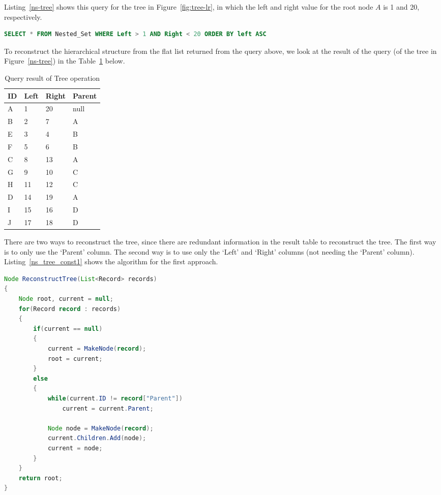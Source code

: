 Listing~\ref{ns-tree} shows this query for the tree in Figure~\ref{fig:tree-lr}, in which the left and right value for the root node $A$ is 1 and 20, respectively.

\begin{lstlisting}[language=sql, caption={Query for Tree for tree $A$ via nested set model},label=ns-tree]
SELECT * FROM Nested_Set WHERE Left > 1 AND Right < 20 ORDER BY left ASC
\end{lstlisting}

To reconstruct the hierarchical structure from the flat list returned from the query above, we look at the result of the query (of the tree in Figure~\ref{ns-tree}) in the Table~\ref{table:ns_tree} below.

\begin{table}[h]
\centering
\begin{tabular}{|l|l|l|l|}
\hline
{\bf ID} & {\bf Left} & {\bf Right} & {\bf Parent} \\ \hline\hline
A & 1 & 20 & null \\ \hline
B & 2 & 7 & A \\ \hline
E & 3 & 4 & B \\ \hline
F & 5 & 6 & B \\ \hline
C & 8 & 13 & A \\ \hline
G & 9 & 10 & C \\ \hline
H & 11 & 12	& C \\ \hline
D & 14 & 19	& A \\ \hline
I & 15 & 16	& D \\ \hline
J & 17 & 18	& D \\ \hline
\end{tabular}
\caption{Query result of Tree operation\label{table:ns_tree}}
\end{table}

There are two ways to reconstruct the tree, since there are redundant information in the result table to reconstruct the tree. The first way is to only use the `Parent' column. The second way is to use only the `Left' and `Right' columns (not needing the `Parent' column). Listing~\ref{ns_tree_const1} shows the algorithm for the first approach.

\begin{lstlisting}[language=java,style=java,caption={Tree reconstruction using Parent},label=ns_tree_const1]
Node ReconstructTree(List<Record> records)
{
    Node root, current = null;
    for(Record record : records)
    {
        if(current == null)
        {
            current = MakeNode(record);
            root = current;
        }
        else
        {
            while(current.ID != record["Parent"])
                current = current.Parent;

            Node node = MakeNode(record);
            current.Children.Add(node);
            current = node;
        }
    }
	return root;
}
\end{lstlisting}

